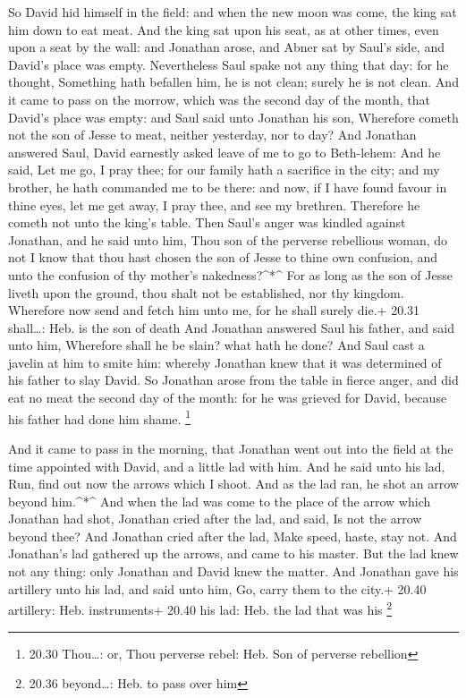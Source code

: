  So David hid himself in the field: and when the new moon
was come, the king sat him down to eat meat.  And the king
sat upon his seat, as at other times, even upon a seat by the wall: and
Jonathan arose, and Abner sat by Saul's side, and David's place was
empty.  Nevertheless Saul spake not any thing that day: for
he thought, Something hath befallen him, he is not clean; surely he is
not clean.  And it came to pass on the morrow, which was
the second day of the month, that David's place was empty: and Saul said
unto Jonathan his son, Wherefore cometh not the son of Jesse to meat,
neither yesterday, nor to day?  And Jonathan answered Saul,
David earnestly asked leave of me to go to Beth-lehem:  And
he said, Let me go, I pray thee; for our family hath a sacrifice in the
city; and my brother, he hath commanded me to be there: and now, if I
have found favour in thine eyes, let me get away, I pray thee, and see
my brethren. Therefore he cometh not unto the king's table.
 Then Saul's anger was kindled against Jonathan, and he
said unto him, Thou son of the perverse rebellious woman, do not I know
that thou hast chosen the son of Jesse to thine own confusion, and unto
the confusion of thy mother's nakedness?\^{}*\^{}  For as
long as the son of Jesse liveth upon the ground, thou shalt not be
established, nor thy kingdom. Wherefore now send and fetch him unto me,
for he shall surely die.+ 20.31 shall\ldots: Heb. is the son of death
 And Jonathan answered Saul his father, and said unto him,
Wherefore shall he be slain? what hath he done?  And Saul
cast a javelin at him to smite him: whereby Jonathan knew that it was
determined of his father to slay David.  So Jonathan arose
from the table in fierce anger, and did eat no meat the second day of
the month: for he was grieved for David, because his father had done him
shame. \footnote{20.30 Thou\ldots: or, Thou perverse rebel: Heb. Son of
  perverse rebellion}

 And it came to pass in the morning, that Jonathan went out
into the field at the time appointed with David, and a little lad with
him.  And he said unto his lad, Run, find out now the
arrows which I shoot. And as the lad ran, he shot an arrow beyond
him.\^{}*\^{}  And when the lad was come to the place of
the arrow which Jonathan had shot, Jonathan cried after the lad, and
said, Is not the arrow beyond thee?  And Jonathan cried
after the lad, Make speed, haste, stay not. And Jonathan's lad gathered
up the arrows, and came to his master.  But the lad knew
not any thing: only Jonathan and David knew the matter. 
And Jonathan gave his artillery unto his lad, and said unto him, Go,
carry them to the city.+ 20.40 artillery: Heb. instruments+ 20.40 his
lad: Heb. the lad that was his \footnote{20.36 beyond\ldots: Heb. to
  pass over him}

